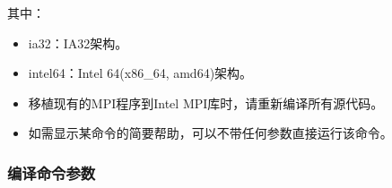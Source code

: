 \documentclass[a4paper,12pt,english]{sphinxmanual}
\begin{document}
\sphinxAtStartPar
其中：
\begin{itemize}
\item {} 
\sphinxAtStartPar
ia32：IA\sphinxhyphen{}32架构。

\item {} 
\sphinxAtStartPar
intel64：Intel 64(x86\_64, amd64)架构。

\item {} 
\sphinxAtStartPar
移植现有的MPI程序到Intel MPI库时，请重新编译所有源代码。

\item {} 
\sphinxAtStartPar
如需显示某命令的简要帮助，可以不带任何参数直接运行该命令。

\end{itemize}


\subsubsection{编译命令参数}
\end{document}

